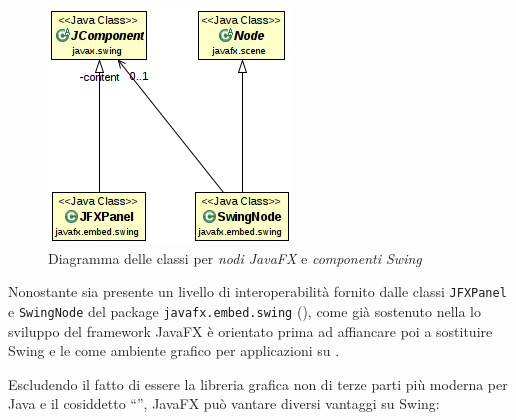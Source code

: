             \begin{figure}[hbpt]
                \centering
                \includegraphics[scale=0.8]{img/jfxSwingAdapt}
                \caption{Diagramma delle classi  per \emph{nodi JavaFX} e \emph{componenti Swing}}
                \label{fig:jfxSwingAdapt}
            \end{figure}

            Nonostante sia presente un livello di interoperabilità fornito dalle classi  \texttt{JFXPanel} e \texttt{SwingNode} del package \texttt{javafx\dothyp embed\dothyp swing} (), come già sostenuto nella  lo sviluppo del framework JavaFX è orientato prima ad affiancare poi a sostituire Swing e le  come ambiente grafico per applicazioni su .

            Escludendo il fatto di essere la libreria grafica non di terze parti più moderna per Java e il cosiddetto ``'', JavaFX può vantare diversi vantaggi su Swing:

